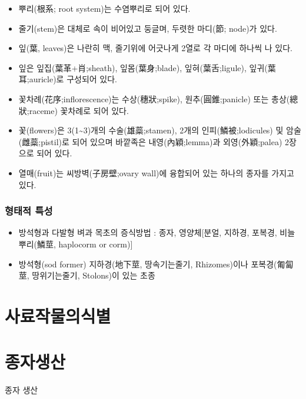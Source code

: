 \documentclass[]{book}
\providecommand{\tightlist}{%
  \setlength{\itemsep}{0pt}\setlength{\parskip}{0pt}}
\begin{document}
\begin{itemize}
\tightlist
\item
  뿌리(根系; root system)는 수염뿌리로 되어 있다.
\item
  줄기(stem)은 대체로 속이 비어있고 둥글며, 두렷한 마디(節; node)가
  있다.
\item
  잎(葉, leaves)은 나란히 맥, 줄기위에 어긋나게 2열로 각 마디에 하나씩
  나 있다.
\item
  잎은 잎집(葉革+肖;sheath), 잎몸(葉身;blade), 잎혀(葉舌;ligule),
  잎귀(葉耳;auricle)로 구성되어 있다.
\item
  꽃차례(花序;inflorescence)는 수상(穗狀;spike), 원추(圓錐;panicle) 또는
  총상(總狀;raceme) 꽃차례로 되어 있다.
\item
  꽃(flowers)은 3(1\textasciitilde{}3)개의 수술(雄蘂;stamen), 2개의
  인피(鱗被;lodicules) 및 암술(雌蘂;pistil)로 되어 있으며 바깥족은
  내영(內穎;lemma)과 외영(外穎;palea) 2장으로 되어 있다.
\item
  열매(fruit)는 씨방벽(子房壁;ovary wall)에 융합되어 있는 하나의 종자를
  가지고 있다.
\end{itemize}

\subsection{형태적 특성}\label{-}

\begin{itemize}
\tightlist
\item
  방석형과 다발형 벼과 목초의 증식방법 : 종자, 영양체{[}분얼, 지하경,
  포복경, 비늘뿌리(鱗莖, haplocorm or corm){]}
\item
  방석형(sod former) 지하경(地下莖, 땅속기는줄기, Rhizomes)이나
  포복경(匍匐莖, 땅위기는줄기, Stolons)이 있는 초종
\end{itemize}

\chapter{사료작물의식별}

\chapter{종자생산}

종자 생산


\end{document}
